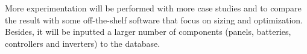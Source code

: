 \documentclass[10pt,conference]{IEEEtran}
\begin{document}
More experimentation will be performed with more case studies and to compare the result with some off-the-shelf software that focus on sizing and optimization. Besides, it will be inputted a larger number of components (panels, batteries, controllers and inverters) to the database.
{}

\vspace{12pt}
\end{document}
